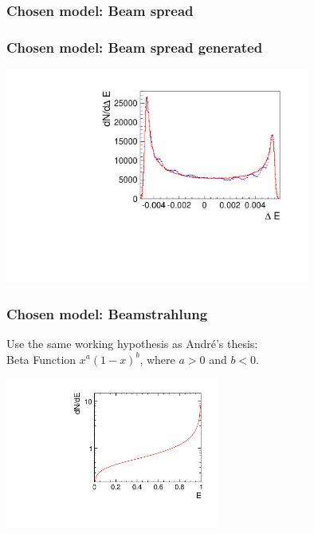 \documentclass[handout]{beamer}
\begin{document}
\begin{frame}
\frametitle{Chosen model: Beam spread}
\end{frame}
\begin{frame}
\frametitle{Chosen model: Beam spread generated}
\includegraphics[width=10cm]{MCBeamSpread}
\end{frame}
\begin{frame}
\frametitle{Chosen model: Beamstrahlung}
Use the same working hypothesis as Andr\'e's thesis:\\
 Beta Function $x^a(1-x)^b$, where $a>0$ and $b<0$.\\
\begin{center}
\includegraphics[width=7cm]{BetaFunction_beamstrahlung}
\end{center}
\end{frame}
\end{document}
